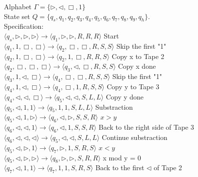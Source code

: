 \documentclass[12pt,a4paper]{article}
\theoremstyle{definition}
\numberwithin{equation}{section}
\numberwithin{figure}{section}
\begin{document}
\begin{enumerate}
Alphabet  $\Gamma = \{ \triangleright, \triangleleft, \Box, 1 \}$\\
State set $Q = \{ q_s, q_1, q_2,q_3,q_4,q_5,q_6,q_7,q_8,q_9,q_h \}$. \\
Specification:\\
$\langle q_s,\triangleright,\triangleright,\triangleright \rangle  \rightarrow  \langle q_1, \triangleright, \triangleright ,R , R, R \rangle$ Start\\
$\langle q_1, 1,\Box, \Box \rangle  \rightarrow  \langle q_2, \Box, \Box, R, S, S \rangle$ Skip the first "1"\\
$\langle q_2, 1,\Box, \Box \rangle  \rightarrow  \langle q_2, 1, \Box, R, R, S \rangle$ Copy x to Tape 2 \\
$\langle q_2, \Box, \Box, \Box \rangle  \rightarrow  \langle q_3, \triangleleft, \Box, R, S, S \rangle$ Copy x done \\
$\langle q_3, 1, \triangleleft, \Box \rangle  \rightarrow  \langle q_4, \Box, \Box, R, S, S \rangle$ Skip the first "1" \\
$\langle q_4, 1,\triangleleft, \Box \rangle  \rightarrow  \langle q_4, \Box, 1, R, S, S \rangle$ Copy y to Tape 3 \\
$\langle q_4, \triangleleft,\triangleleft, \Box \rangle  \rightarrow  \langle q_5, \triangleleft, \triangleleft, S, L, L \rangle$ Copy y done \\
$\langle q_5, \triangleleft, 1, 1 \rangle  \rightarrow  \langle q_5, 1, 1, S, L, L \rangle$ Substraction \\
$\langle q_5, \triangleleft, 1, \triangleright \rangle  \rightarrow  \langle q_6, \triangleleft, \triangleright, S, S, R \rangle$  $x > y$ \\
$\langle q_6, \triangleleft, \triangleleft, 1 \rangle  \rightarrow  \langle q_6, \triangleleft, 1, S, S, R \rangle$ Back to the right side of Tape 3 \\
$\langle q_6, \triangleleft, \triangleleft, \triangleleft \rangle  \rightarrow  \langle q_5, \triangleleft, \triangleleft, S, L, L \rangle$  Continue substraction\\
$\langle q_5, \triangleleft, \triangleright, 1 \rangle  \rightarrow  \langle q_7, \triangleright, 1, S, R, S \rangle$  $x < y$ \\
$\langle q_5, \triangleleft, \triangleright, \triangleright \rangle  \rightarrow  \langle q_8, \triangleright, \triangleright, S, R, R \rangle$  x mod y = 0\\
$\langle q_7, \triangleleft, 1, 1 \rangle  \rightarrow  \langle q_7, 1, 1, S, R, S \rangle$  Back to the first $\triangleleft$ of Tape 2 \\

\end{enumerate}
\end{document}
